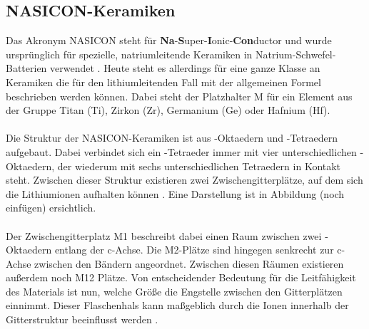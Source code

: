 \documentclass[a4paper, 11pt, headsepline,footsepline,twoside,abstract]{scrbook}
\begin{document}
\subsection{NASICON-Keramiken}
Das Akronym NASICON steht für \textbf{Na}-\textbf{S}uper-\textbf{I}onic-\textbf{Con}ductor und wurde ursprünglich für spezielle, natriumleitende Keramiken in Natrium-Schwefel-Batterien verwendet \cite{hagman1968crystal}. Heute steht es allerdings für eine ganze Klasse an Keramiken die für den lithiumleitenden Fall mit der allgemeinen Formel  beschrieben werden können. Dabei steht der Platzhalter M für ein Element aus der Gruppe Titan (Ti), Zirkon (Zr), Germanium (Ge) oder Hafnium (Hf).
\\\\
Die Struktur der NASICON-Keramiken ist aus -Oktaedern und -Tetraedern aufgebaut. Dabei verbindet sich ein -Tetraeder immer mit vier unterschiedlichen -Oktaedern, der wiederum mit sechs unterschiedlichen Tetraedern in Kontakt steht. Zwischen dieser Struktur existieren zwei Zwischengitterplätze, auf dem sich die Lithiumionen aufhalten können \cite{knauth2009inorganic}. Eine Darstellung ist in Abbildung (noch einfügen) ersichtlich.
\\\\
Der Zwischengitterplatz M1 beschreibt dabei einen Raum zwischen zwei -Oktaedern entlang der c-Achse. Die M2-Plätze sind hingegen senkrecht zur c-Achse zwischen den Bändern angeordnet. Zwischen diesen Räumen existieren außerdem noch M12 Plätze. Von entscheidender Bedeutung für die Leitfähigkeit des Materials ist nun, welche Größe die Engstelle zwischen den Gitterplätzen einnimmt. Dieser Flaschenhals kann maßgeblich durch die Ionen innerhalb der Gitterstruktur beeinflusst werden \cite{cao2014recent}.
\end{document}
